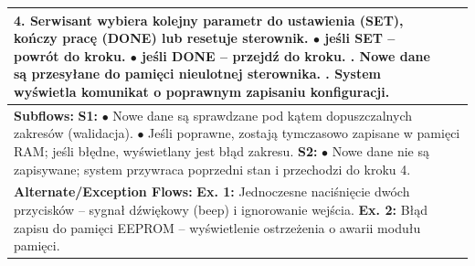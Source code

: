\documentclass[a4paper,12pt]{article}
\begin{document}
\begin{table}[h]
\begin{tabular}{|p{}|p{}|p{}|}
{4. Serwisant wybiera kolejny parametr do ustawienia (SET), kończy pracę (DONE) lub resetuje sterownik. \newline
\hspace*{10pt} $\bullet$ jeśli SET – powrót do kroku. \newline
\hspace*{10pt} $\bullet$ jeśli DONE – przejdź do kroku. \newline
5. Nowe dane są przesyłane do pamięci nieulotnej sterownika. \newline
6. System wyświetla komunikat o poprawnym zapisaniu konfiguracji.} \\ \hline
\multicolumn{3}{|p{0.9\textwidth}|}{\textbf{Subflows:} \newline
\textbf{S1:} \newline
\hspace*{10pt} $\bullet$ Nowe dane są sprawdzane pod kątem dopuszczalnych zakresów (walidacja). \newline
\hspace*{10pt} $\bullet$ Jeśli poprawne, zostają tymczasowo zapisane w pamięci RAM; jeśli błędne, wyświetlany jest błąd zakresu. \newline
\textbf{S2:} \newline
\hspace*{10pt} $\bullet$ Nowe dane nie są zapisywane; system przywraca poprzedni stan i przechodzi do kroku 4.} \\ \hline
\multicolumn{3}{|p{0.9\textwidth}|}{\textbf{Alternate/Exception Flows:} \newline
\textbf{Ex. 1:} Jednoczesne naciśnięcie dwóch przycisków – sygnał dźwiękowy (beep) i ignorowanie wejścia. \newline
\textbf{Ex. 2:} Błąd zapisu do pamięci EEPROM – wyświetlenie ostrzeżenia o awarii modułu pamięci.} \\ \hline
\end{tabular}
\end{table}

\pagebreak
\end{document}
